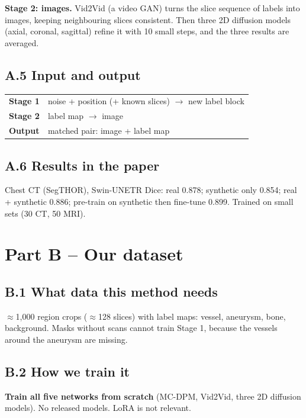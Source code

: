 \documentclass[11pt,a4paper,oneside]{report}
\begin{document}
\textbf{Stage 2: images.} Vid2Vid (a video GAN) turns the slice sequence of labels into images, keeping neighbouring slices consistent. Then three 2D diffusion models (axial, coronal, sagittal) refine it with 10 small steps, and the three results are averaged.

\subsection*{A.5 Input and output}
\begin{center}
\small
\begin{tabularx}{\linewidth}{lX}
\toprule
\textbf{Stage 1} & noise + position (+ known slices) $\rightarrow$ new label block \\
\textbf{Stage 2} & label map $\rightarrow$ image \\
\textbf{Output} & matched pair: image + label map \\
\bottomrule
\end{tabularx}
\end{center}

\subsection*{A.6 Results in the paper}
Chest CT (SegTHOR), Swin-UNETR Dice: real 0.878; synthetic only 0.854; real + synthetic 0.886; pre-train on synthetic then fine-tune 0.899. Trained on small sets (30 CT, 50 MRI).

\section{Part B -- Our dataset}

\subsection*{B.1 What data this method needs}
$\approx$1{,}000 region crops ($\approx$128 slices) with label maps: vessel, aneurysm, bone, background. Masks without scans cannot train Stage 1, because the vessels around the aneurysm are missing.

\subsection*{B.2 How we train it}
\textbf{Train all five networks from scratch} (MC-DPM, Vid2Vid, three 2D diffusion models). No released models. LoRA is not relevant.
\end{document}
